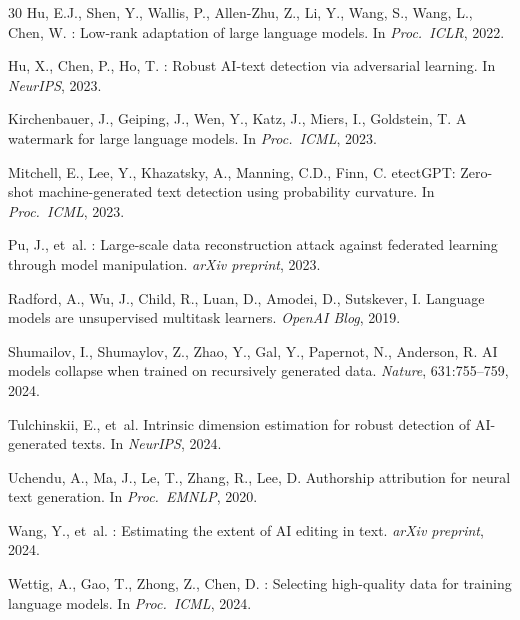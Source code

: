 \documentclass[11pt,a4paper]{article}
\begin{document}
\begin{thebibliography}{30}
Hu, E.J., Shen, Y., Wallis, P., Allen-Zhu, Z., Li, Y., Wang, S., Wang, L., Chen, W.
: Low-rank adaptation of large language models.
\newblock In \emph{Proc.\ ICLR}, 2022.

Hu, X., Chen, P., Ho, T.
: Robust {AI}-text detection via adversarial learning.
\newblock In \emph{NeurIPS}, 2023.

Kirchenbauer, J., Geiping, J., Wen, Y., Katz, J., Miers, I., Goldstein, T.
\newblock A watermark for large language models.
\newblock In \emph{Proc.\ ICML}, 2023.

Mitchell, E., Lee, Y., Khazatsky, A., Manning, C.D., Finn, C.
etect{GPT}: Zero-shot machine-generated text detection using probability curvature.
\newblock In \emph{Proc.\ ICML}, 2023.

Pu, J., et~al.
: Large-scale data reconstruction attack against federated learning through model manipulation.
\newblock \emph{arXiv preprint}, 2023.

Radford, A., Wu, J., Child, R., Luan, D., Amodei, D., Sutskever, I.
\newblock Language models are unsupervised multitask learners.
\newblock \emph{OpenAI Blog}, 2019.

Shumailov, I., Shumaylov, Z., Zhao, Y., Gal, Y., Papernot, N., Anderson, R.
\newblock AI models collapse when trained on recursively generated data.
\newblock \emph{Nature}, 631:755--759, 2024.

Tulchinskii, E., et~al.
\newblock Intrinsic dimension estimation for robust detection of {AI}-generated texts.
\newblock In \emph{NeurIPS}, 2024.

Uchendu, A., Ma, J., Le, T., Zhang, R., Lee, D.
\newblock Authorship attribution for neural text generation.
\newblock In \emph{Proc.\ EMNLP}, 2020.

Wang, Y., et~al.
: Estimating the extent of {AI} editing in text.
\newblock \emph{arXiv preprint}, 2024.

Wettig, A., Gao, T., Zhong, Z., Chen, D.
: Selecting high-quality data for training language models.
\newblock In \emph{Proc.\ ICML}, 2024.


\end{thebibliography}
\end{document}

